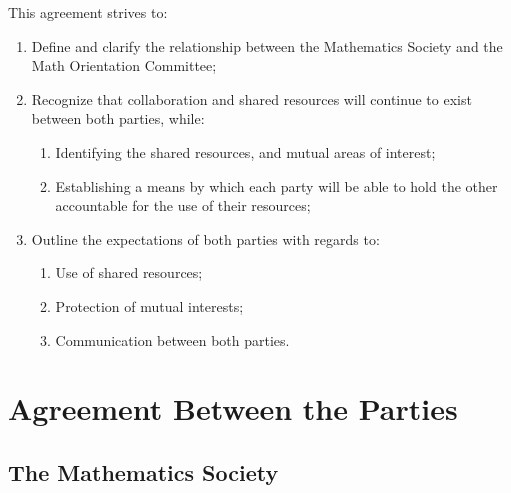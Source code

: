 \documentclass[12pt, letterpaper]{mathsoc}
\begin{document}
This agreement strives to:
\begin{enumerate}
    \item Define and clarify the relationship between the Mathematics Society and the Math Orientation Committee;
    \item Recognize that collaboration and shared resources will continue to exist between both parties, while:
    \begin{enumerate}
        \item Identifying the shared resources, and mutual areas of interest;
        \item Establishing a means by which each party will be able to hold the other accountable for the use of their resources;
    \end{enumerate}
    \item Outline the expectations of both parties with regards to:
    \begin{enumerate}
        \item Use of shared resources;
        \item Protection of mutual interests;
        \item Communication between both parties.
    \end{enumerate}
\end{enumerate}

\section{Agreement Between the Parties}

\subsection{The Mathematics Society}
\end{document}

